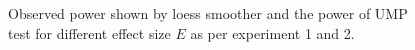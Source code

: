 \documentclass{article}
\begin{document}
\begin{figure}[hbtp]
   \centering
       \caption{Observed power shown by loess smoother and the power of UMP test for different effect size $E$ as per experiment 1 and 2.}
       \label{fig:power_effect1}
\end{figure}
\end{document}
